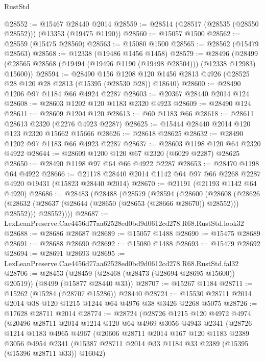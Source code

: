 \begin{lexlean}{RustStd}
\begin{coremodule}
@28552 := @15467 @28440 @2014
@28559 := @28514 (@28517 (@28535 (@28550 @28552))) (@13353 (@19475 @1190))
@28560 := @15057 @1500
@28562 := @28559 (@15475 @28560)
@28563 := @15080 @1500
@28565 := @28562 (@15479 @28563)
@28568 := @12338 (@19486 @1456 @1458)
@28579 := @28496
    (@28499 (@28565 @28568 (@19494 (@19496 @1190 (@19498 @28504))) (@12338 @12983) @15600))
@28594 := @28490
    @156
    @1208
    @120
    @1456
    @2813
    @4926
    (@28525 @28 @120 @28 @2813 (@15395 (@28530 @28)) @18640)
@28600 := @28490 @1206 @97 @1184 @66 @4924 @2287
@28603 := @20367 @28440 @2014 @124
@28608 := @28603 @1202 @120 @1183 @2320 @4923
@28609 := @28490 @124
@28611 := @28609 @1204 @120
@28613 := @60 @1183 @66
@28618 := @28611 @28613 @2320 (@2276 @4923 @2287)
@28625 := @15444 @28440 @2014 @120 @123 @2320 @15662 @15666
@28626 := @28618 @28625
@28632 := @28490 @1202 @97 @1183 @66 @4923 @2287
@28637 := @28603 @1198 @120 @64 @2320 @4922
@28644 := @28609 @1200 @120 @67 @2320 (@6029 @2287) @28625
@28650 := @28490 @1198 @97 @64 @66 @4922 @2287
@28653 := @28470 @1198 @64 @4922
@28666 := @21178 @28440 @2014 @1142 @64 @97 @66 @2268 @2287 @4920 @19431 (@15823 @28440 @2014)
@28670 := @21191 (@21193 @1142 @64 @4920)
@28686 := @28483
    (@28488
      (@28579
        (@28594
          (@28600
            (@28608
              (@28626 (@28632 (@28637 (@28644 (@28650 (@28653 (@28666 @28670)) @28552))) @28552)))
            @28552))))
@28687 := LexLeanPreserve.Cae4456d77aa62528ed0bd9d0612cd278.R68.RustStd.look32
@28688 := @28686 @28687
@28689 := @15057 @1488
@28690 := @15475 @28689
@28691 := @28688 @28690
@28692 := @15080 @1488
@28693 := @15479 @28692
@28694 := @28691 @28693
@28695 := LexLeanPreserve.Cae4456d77aa62528ed0bd9d0612cd278.R68.RustStd.fal32
@28706 := @28453
    (@28459 (@28468 (@28473 (@28694 @28695 @15600)) @20519))
    (@8499 (@15877 @28440 @33))
@28707 := @15267 @1184
@28711 := @15262 (@15284 (@28707 @15286)) @28440
@28724 := @15530 @28711 @2014 @2014 @38 @120 @1215 @1244 @64 @4976 @38 @3426 @2268 @5075
@28726 := @17628 @28711 @2014
@28774 := @28724
    (@28726
      @1215
      @120
      @4972
      @4974
      (@20496
        @28711
        @2014
        @1214
        @120
        @64
        @4969
        @3056
        @4943
        @2341
        (@28726
          @1214
          @1183
          @4965
          @4967
          (@20606
            @28711
            @2014
            @167
            @120
            @1183
            @2389
            @3056
            @4954
            @2341
            (@15387 @28711 @2014 @33 @1184 @33 @2389 (@15395 (@15396 @28711 @33)) @16042)

\end{coremodule}
\end{lexlean}
